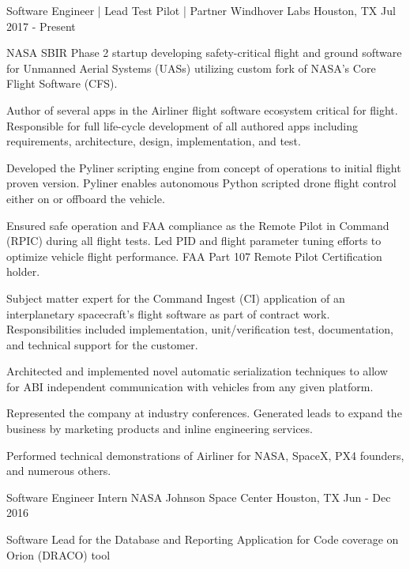 \begin{cventries}
  \cventry
    {Software Engineer | Lead Test Pilot | Partner} 
    {Windhover Labs} 
    {Houston, TX} 
    {Jul 2017 - Present} 
    {
      \begin{cvitems}
        \item {NASA SBIR Phase 2 startup developing safety-critical flight and ground software for Unmanned Aerial Systems (UASs) utilizing custom fork of NASA's Core Flight Software (CFS).}
        \item {Author of several apps in the Airliner flight software ecosystem critical for flight. Responsible for full life-cycle development of all authored apps including requirements, architecture, design, implementation, and test.}
        \item {Developed the Pyliner scripting engine from concept of operations to initial flight proven version. Pyliner enables autonomous Python scripted drone flight control either on or offboard the vehicle.}
        \item {Ensured safe operation and FAA compliance as the Remote Pilot in Command (RPIC) during all flight tests. Led PID and flight parameter tuning efforts to optimize vehicle flight performance. FAA Part 107 Remote Pilot Certification holder.}
        \item {Subject matter expert for the Command Ingest (CI) application of an interplanetary spacecraft's flight software as part of contract work. Responsibilities included implementation, unit/verification test, documentation, and technical support for the customer. }
        \item {Architected and implemented novel automatic serialization techniques to allow for ABI independent communication with vehicles from any given platform. }
        \item {Represented the company at industry conferences. Generated leads to expand the business by marketing products and inline engineering services. }
        \item {Performed technical demonstrations of Airliner for NASA, SpaceX, PX4 founders, and numerous others.}
      \end{cvitems}
    }
  \cventry
    {Software Engineer Intern} 
    {NASA Johnson Space Center} 
    {Houston, TX} 
    {Jun - Dec 2016} 
    {
      \begin{cvitems} 
        \item {Software Lead for the Database and Reporting Application for Code coverage on Orion (DRACO) tool
}
\end{cvitems}}
\end{cventries}
